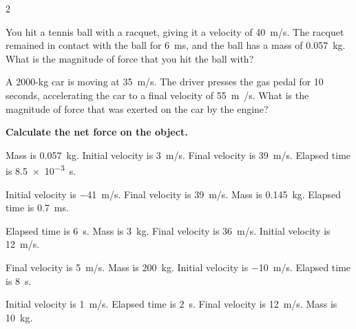 \documentclass{article}
\numberwithin{equation}{section}
\numberwithin{figure}{section}
\begin{document}
\begin{multicols}{2}
\begin{exercise} \label{R5mamD}
    You hit a tennis ball with a racquet, giving it a velocity of \SI{40}{m/s}. The racquet remained in contact with the ball for \SI{6}{ms}, and the ball has a mass of \SI{0.057}{kg}. What is the magnitude of force that you hit the ball with?
\end{exercise}

\begin{exercise} \label{rVq3Tj}
    A 2000-kg car is moving at \SI{35}{m/s}. The driver presses the gas pedal for 10 seconds, accelerating the car to a final velocity of \SI{55}{m/}s. What is the magnitude of force that was exerted on the car by the engine?
\end{exercise}

\cyanhrule

\textbf{Calculate the net force on the object.}

\begin{exercise} \label{4Me32D}
    Mass is \SI{0.057}{kg}. Initial velocity is \SI{3}{m/s}. Final velocity is \SI{39}{m/s}. Elapsed time is \SI{8.5e-3}{s}.
\end{exercise}

\begin{exercise} \label{LKi6tV}
    Initial velocity is \SI{-41}{m/s}. Final velocity is \SI{39}{m/s}. Mass is \SI{0.145}{kg}. Elapsed time is \SI{0.7}{ms}.
\end{exercise}

\begin{exercise} \label{uWU1Cn}
    Elapsed time is \SI{6}{s}. Mass is \SI{3}{kg}. Final velocity is \SI{36}{m/s}. Initial velocity is \SI{12}{m/s}.
\end{exercise}

\begin{exercise} \label{2doawd}
    Final velocity is \SI{5}{m/s}. Mass is \SI{200}{kg}. Initial velocity is \SI{-10}{m/s}.  Elapsed time is \SI{8}{s}.
\end{exercise}

\begin{exercise} \label{I7jORB}
    Initial velocity is \SI{1}{m/s}. Elapsed time is \SI{2}{s}. Final velocity is \SI{12}{m/s}.  Mass is \SI{10}{kg}.
\end{exercise}

\cyanhrule



\end{multicols}
\end{document}
